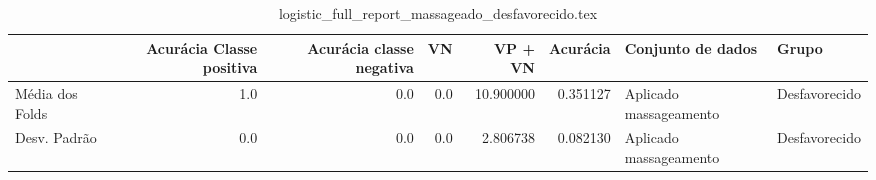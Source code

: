 \begin{table}
\centering
\caption{logistic_full_report_massageado_desfavorecido.tex}
\label{logistic_full_report_massageado_desfavorecido.tex}
\begin{tabular}{lrrrrrll}
\toprule
{} &  Acurácia Classe positiva &  Acurácia classe negativa &  VN  &   VP + VN  &  Acurácia &       Conjunto de dados &          Grupo \\
\midrule
Média dos Folds &                       1.0 &                       0.0 &  0.0 &  10.900000 &  0.351127 &  Aplicado massageamento &  Desfavorecido \\
Desv. Padrão    &                       0.0 &                       0.0 &  0.0 &   2.806738 &  0.082130 &  Aplicado massageamento &  Desfavorecido \\
\bottomrule
\end{tabular}
\end{table}
